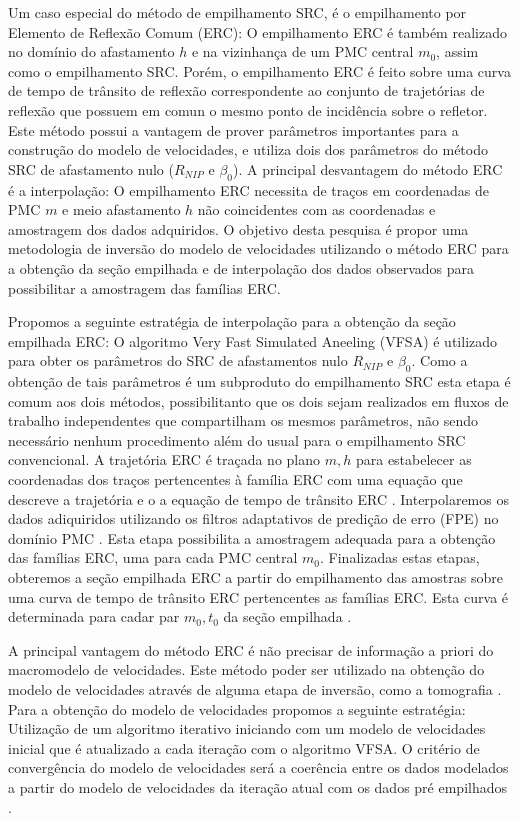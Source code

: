 Um caso especial do método de empilhamento SRC, é o empilhamento por Elemento de Reflexão Comum (ERC):
O empilhamento ERC é também realizado no domínio do afastamento $h$ e na vizinhança de um PMC central $m_0$, assim como o
empilhamento SRC. Porém, o empilhamento ERC é feito sobre uma curva de tempo de trânsito de reflexão correspondente ao
conjunto de trajetórias de reflexão que possuem em comun
o mesmo ponto de incidência sobre o refletor.
Este método possui a vantagem de prover
parâmetros importantes para a construção do modelo de velocidades, e utiliza dois dos parâmetros
do método SRC de afastamento nulo ($R_{NIP}$ e $\beta_0$).
A principal desvantagem do método ERC é a interpolação: O empilhamento ERC necessita de 
traços em coordenadas de PMC $m$ e meio afastamento $h$ não coincidentes com as coordenadas
e amostragem dos dados adquiridos.
O objetivo desta pesquisa é propor uma metodologia de inversão do modelo de velocidades utilizando o método ERC para
a obtenção da seção empilhada e de interpolação dos dados observados para possibilitar a amostragem das famílias ERC. 

Propomos a seguinte estratégia de interpolação para a obtenção da seção empilhada ERC:
O algoritmo Very Fast Simulated Aneeling (VFSA) é utilizado para obter os parâmetros do SRC de afastamentos nulo
$R_{NIP}$ e $\beta_0$. Como a obtenção de tais parâmetros é um subproduto do empilhamento SRC esta etapa é comum
aos dois métodos, possibilitanto que os dois sejam realizados em fluxos de trabalho independentes que compartilham os 
mesmos parâmetros, não sendo necessário nenhum procedimento além do usual para o empilhamento SRC convencional.
A trajetória ERC é traçada no plano $m, h$ para estabelecer as coordenadas dos traços pertencentes à família ERC
com uma equação que descreve a trajetória e o a equação de tempo de trânsito ERC \cite{cre}.
Interpolaremos os dados adiquiridos utilizando os filtros adaptativos de predição de erro (FPE) no domínio PMC \cite{liu11}.
Esta etapa possibilita a amostragem adequada para a obtenção das famílias ERC,
uma para cada PMC central $m_0$. 
Finalizadas estas etapas,
obteremos a seção empilhada ERC a partir do empilhamento das amostras sobre uma curva de tempo de trânsito ERC 
pertencentes as famílias ERC. Esta curva é determinada para cadar par $m_0, t_0$ da seção empilhada \cite{cre}.

A principal vantagem do método ERC é não precisar de informação a priori do macromodelo de velocidades. 
Este método poder ser utilizado na obtenção do modelo de velocidades através de alguma etapa de inversão,
como a tomografia \cite{cre}. Para a obtenção do modelo de velocidades propomos a seguinte estratégia:
Utilização de um algoritmo iterativo iniciando com um modelo de velocidades inicial que é atualizado
a cada iteração com o algoritmo VFSA. 
O critério de convergência do modelo de velocidades será a coerência entre
os dados modelados a partir do modelo de velocidades da iteração atual com os dados pré empilhados \cite{mesquita}.

